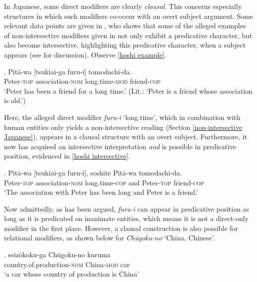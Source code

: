 In Japanese, some direct modifiers are clearly \textit{clausal}. This concerns especially structures in which such modifiers co-occur with an overt subject argument. Some relevant data points are given in \citet{hoshi:2002:kaynean}, who shows that some of the alleged examples of non-intersective modifiers given in \citet{yamakido:2000:japanese} not only exhibit a predicative character, but also become intersective, highlighting this predicative character, when a subject appears (see \citealt{yamakido:2005:nature} for discussion). Observe \ref{hoshi example}. 

\exg. Pītā-wa [tsukiai-ga furu-i] tomodachi-da.\\
Peter-\textsc{top} association-\textsc{nom} long.time-\textsc{mod} friend-\textsc{cop}\\
`Peter has been a friend for a long time.’ (Lit.: `Peter is a friend whose association is old.’)  \hfill \citep[11]{hoshi:2002:kaynean} \label{hoshi example}

Here, the alleged direct modifier \textit{furu-i} `long.time’, which in combination with human entities only yields a non-intersective reading (Section \ref{non-intersective Japanese}), appears in a clausal structure with an overt subject. Furthermore, it now has acquired an intersective interpretation \textit{and} is possible in predicative position, evidenced in \ref{hoshi intersective}.

\exg. Pītā-wa [tsukiai-ga furu-i], soshite Pītā-wa tomodachi-da.\\
Peter-\textsc{top} association-\textsc{nom} long.time-\textsc{cop} and Peter-\textsc{top} friend-\textsc{cop}\\
`The association with Peter has been long and Peter is a friend.’ \\ \null \hfill \citep[11]{hoshi:2002:kaynean} \label{hoshi intersective}

Now admittedly, as has been argued, \textit{furu-i} can appear in predicative position as long as it is predicated on inanimate entities, which means it is not a direct-only modifier in the first place. However, a clausal construction is also possible for relational modifiers, as shown below for \textit{Chūgoku-no} `China, Chinese’. 

\exg. seizōkoku-ga Chūgoku-no kuruma\\
country.of.production-\textsc{nom} China-\textsc{mod} car\\
`a car whose country of production is China’

